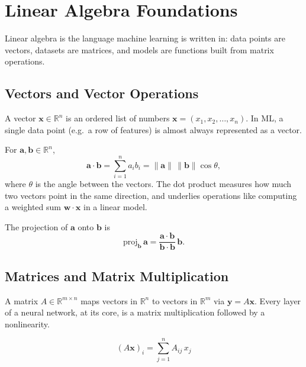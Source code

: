 \chapter{Linear Algebra Foundations}

Linear algebra is the language machine learning is written in: data points
are vectors, datasets are matrices, and models are functions built from
matrix operations.

\section{Vectors and Vector Operations}

A vector $\mathbf{x} \in \mathbb{R}^n$ is an ordered list of numbers
$\mathbf{x} = (x_1, x_2, \ldots, x_n)$. In ML, a single data point (e.g.\ a
row of features) is almost always represented as a vector.

\begin{definition}
For $\mathbf{a}, \mathbf{b} \in \mathbb{R}^n$,
\[
  \mathbf{a}\cdot\mathbf{b} = \sum_{i=1}^n a_i b_i = \|\mathbf{a}\|\,\|\mathbf{b}\|\cos\theta,
\]
where $\theta$ is the angle between the vectors. The dot product measures
how much two vectors point in the same direction, and underlies operations
like computing a weighted sum $\mathbf{w}\cdot\mathbf{x}$ in a linear model.
\end{definition}

\begin{definition}
The projection of $\mathbf{a}$ onto $\mathbf{b}$ is
\[
  \mathrm{proj}_{\mathbf{b}}\,\mathbf{a} = \frac{\mathbf{a}\cdot\mathbf{b}}{\mathbf{b}\cdot\mathbf{b}}\,\mathbf{b}.
\]
\end{definition}


\section{Matrices and Matrix Multiplication}

A matrix $A \in \mathbb{R}^{m\times n}$ maps vectors in $\mathbb{R}^n$ to
vectors in $\mathbb{R}^m$ via $\mathbf{y} = A\mathbf{x}$. Every layer of a
neural network, at its core, is a matrix multiplication followed by a
nonlinearity.

\[
  (A\mathbf{x})_i = \sum_{j=1}^n A_{ij}\,x_j
\]

